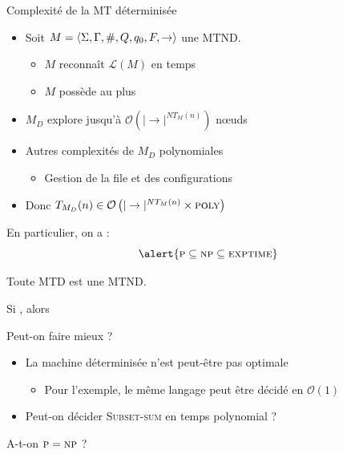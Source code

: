 
\begingroup

\begin{frame}{Complexité de la MT déterminisée}

  \vspace{1mm}
  \begin{itemize}
  \item Soit $M = \langle \Sigma, \Gamma, \#, Q, q_0, F, \rightarrow \rangle$ une MTND.
    \begin{itemize}
    \item $M$ reconnaît $\mathcal{L}(M)$ en temps 
    \item $M$ possède au plus \structure{$|\rightarrow|$}
    \end{itemize}
  \item $M_D$ explore jusqu'à $\mathcal{O}\left(|\rightarrow|^{NT_M(n)}\right)$ n\oe uds
  \item Autres complexités de $M_D$ polynomiales
    \begin{itemize}
    \item Gestion de la file et des configurations
    \end{itemize}
  \item Donc \alert{$T_{M_D}(n) \in \mathcal{O}\left(|\rightarrow|^{NT_M(n)} \times \textsc{poly}\right)$}
  \end{itemize}

  \vspace{2mm}
  En particulier, on a :
  {\Large
    $$\alert{\textsc{p} \subseteq \textsc{np} \subseteq \textsc{exptime}}$$
  }
  
  \begin{description}
  \item[$\textsc{p} \subseteq \textsc{np}$ : ] Toute MTD est une MTND.
  \item[$\textsc{np} \subseteq \textsc{exptime}$ : ] Si , alors 
  \end{description}
  
  \begin{alertblock}{Peut-on faire mieux ?}
    \begin{itemize}
    \item La machine déterminisée n'est peut-être pas optimale
      \begin{itemize}
      \item Pour l'exemple, le même langage peut être décidé en $\mathcal{O}(1)$
      \end{itemize}
    \item Peut-on décider \textsc{Subset-sum} en temps polynomial ? 
    \end{itemize}
    \begin{center}
      \Large
      \alert{A-t-on $\textsc{p} = \textsc{np}$ ?}
    \end{center}
  \end{alertblock}


\end{frame}
